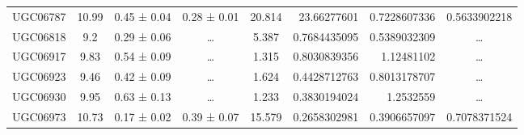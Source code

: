\documentclass[reprint,%
 amsmath,amssymb,
 aps,
]{revtex4-1}
\begin{document}
\begin{table}[]
\begin{tabular}{cccccrrc}
\rowcolor[HTML]{F3F3F3} 
UGC06787             & 10.99                     & 0.45 ± 0.04           & 0.28 ± 0.01            & 20.814                                                       & 23.66277601                                                           & 0.7228607336                                                          & \multicolumn{1}{r}{\cellcolor[HTML]{F3F3F3}0.5633902218}      \\
\rowcolor[HTML]{F3F3F3} 
UGC06818             & 9.2                       & 0.29 ± 0.06           & …                      & 5.387                                                        & 0.7684435095                                                          & 0.5389032309                                                          & …                                                             \\
\rowcolor[HTML]{F3F3F3} 
UGC06917             & 9.83                      & 0.54 ± 0.09           & …                      & 1.315                                                        & 0.8030839356                                                          & 1.12481102                                                            & …                                                             \\
\rowcolor[HTML]{F3F3F3} 
UGC06923             & 9.46                      & 0.42 ± 0.09           & …                      & 1.624                                                        & 0.4428712763                                                          & 0.8013178707                                                          & …                                                             \\
\rowcolor[HTML]{F3F3F3} 
UGC06930             & 9.95                      & 0.63 ± 0.13           & …                      & 1.233                                                        & 0.3830194024                                                          & 1.2532559                                                             & …                                                             \\
\rowcolor[HTML]{F3F3F3} 
UGC06973             & 10.73                     & 0.17 ± 0.02           & 0.39 ± 0.07            & 15.579                                                       & 0.2658302981                                                          & 0.3906657097                                                          & \multicolumn{1}{r}{\cellcolor[HTML]{F3F3F3}0.7078371524}      \\

\end{tabular}
\end{table}
\end{document}
